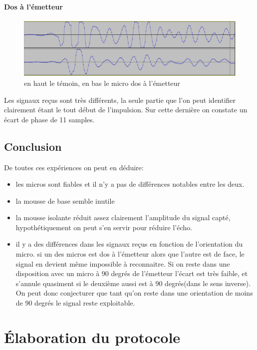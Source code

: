 \documentclass[12pt,a4paper]{report}
\begin{document}
\subsubsection{Dos à l'émetteur}
\begin{figure}[H]
\includegraphics[width=\textwidth]{img/dos_a_la_source.png}
\caption{en haut le témoin, en bas le micro dos à l'émetteur}
\end{figure}
Les signaux reçus sont très différents, la seule partie que l'on peut identifier clairement étant le tout début de l'impulsion. Sur cette dernière on constate un écart de phase de 11 samples.

\section{Conclusion}
De toutes ces expériences on peut en déduire:
\begin{itemize}
\item les micros sont fiables et il n'y a pas de différences notables entre les deux.
\item la mousse de base semble inutile
\item la mousse isolante réduit assez clairement l'amplitude du signal capté, hypothétiquement on peut s'en servir pour réduire l'écho.
\item il y a des différences dans les signaux reçus en fonction de l'orientation du micro. si un des micros est dos à l'émetteur alors que l'autre est de face, le signal en devient même impossible à reconnaitre. Si on reste dans une disposition avec un micro à 90 degrés de l'émetteur l'écart est très faible, et s'annule quasiment si le deuxième aussi est à 90 degrés(dans le sens inverse). On peut donc conjecturer que tant qu'on reste dans une orientation de moins de 90 degrés le signal reste exploitable.
\end{itemize}





\chapter{Élaboration du protocole}
\end{document}
